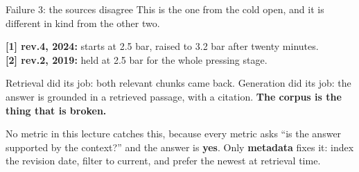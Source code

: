 \documentclass[aspectratio=169]{beamer}
\newcommand{\trapbox}[1]{%
  \begin{tcolorbox}[colback=armred!8, colframe=armred, boxrule=0.6pt, arc=2pt]
  #1
  \end{tcolorbox}}
\begin{document}
\begin{frame}{Failure 3: the sources disagree}
  \vspace{0.6em}
  This is the one from the cold open, and it is different in kind from the other two.

  \vspace{0.9em}
  \begin{center}
  \begin{tcolorbox}[colback=lightbg, colframe=gray, boxrule=0.5pt, arc=2pt, width=0.92\textwidth]
    \small
    \textbf{[1] rev.4, 2024:} starts at 2.5 bar, raised to 3.2 bar after twenty minutes.\\
    \textbf{[2] rev.2, 2019:} held at 2.5 bar for the whole pressing stage.
  \end{tcolorbox}
  \end{center}

  \vspace{0.9em}
  Retrieval did its job: both relevant chunks came back. Generation did its job: the answer
  is grounded in a retrieved passage, with a citation. \textbf{The corpus is the thing that
  is broken.}

  \vspace{0.9em}
  \trapbox{No metric in this lecture catches this, because every metric asks ``is the answer
  supported by the context?'' and the answer is \textbf{yes}. Only \textbf{metadata} fixes
  it: index the revision date, filter to current, and prefer the newest at retrieval time.}
\end{frame}
\end{document}
